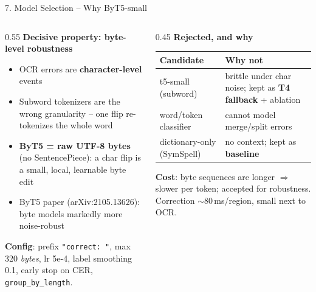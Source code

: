 \documentclass[10pt,aspectratio=169]{beamer}
\begin{document}
\begin{frame}{7. Model Selection -- Why ByT5-small}
\begin{columns}[T]
\begin{column}{0.55\textwidth}
\textbf{Decisive property: byte-level robustness}
\begin{itemize}\small
  \item OCR errors are \textbf{character-level} events
  \item Subword tokenizers are the wrong granularity -- one flip re-tokenizes the whole word
  \item \textbf{ByT5 = raw UTF-8 bytes} (no SentencePiece): a char flip is a small, local, learnable byte edit
  \item ByT5 paper (arXiv:2105.13626): byte models markedly more noise-robust
\end{itemize}
\textbf{Config}: prefix \texttt{"correct: "}, max 320 \emph{bytes}, lr 5e-4, label smoothing 0.1, early stop on CER, \texttt{group\_by\_length}.
\end{column}
\begin{column}{0.45\textwidth}
\textbf{Rejected, and why}
\begin{table}[h]
\centering\scriptsize
\begin{tabular}{p{2.0cm}p{3.0cm}}
\toprule
\textbf{Candidate} & \textbf{Why not} \\
\midrule
t5-small (subword) & brittle under char noise; kept as \textbf{T4 fallback} + ablation \\
word/token classifier & cannot model merge/split errors \\
dictionary-only (SymSpell) & no context; kept as \textbf{baseline} \\
\bottomrule
\end{tabular}
\end{table}
\vspace{0.1cm}
\scriptsize \textbf{Cost}: byte sequences are longer $\Rightarrow$ slower per token; accepted for robustness. Correction $\sim$80\,ms/region, small next to OCR.
\end{column}
\end{columns}
\end{frame}
\end{document}
